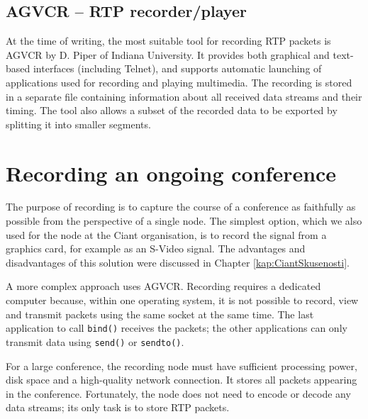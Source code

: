 \subsection{AGVCR -- RTP recorder/player}
At the time of writing, the most suitable tool for recording RTP packets is AGVCR by D. Piper \cite{AGVCR-home} of Indiana University. It provides both graphical and text-based interfaces (including Telnet), and supports automatic launching of applications used for recording and playing multimedia. The recording is stored in a separate file containing information about all received data streams and their timing. The tool also allows a subset of the recorded data to be exported by splitting it into smaller segments.

\section{Recording an ongoing conference}

The purpose of recording is to capture the course of a conference as faithfully as possible from the perspective of a single node. The simplest option, which we also used for the node at the Ciant organisation, is to record the signal from a graphics card, for example as an S-Video signal. The advantages and disadvantages of this solution were discussed in Chapter \ref{kap:CiantSkusenosti}.

A more complex approach uses AGVCR. Recording requires a dedicated computer because, within one operating system, it is not possible to record, view and transmit packets using the same socket at the same time. The last application to call \verb|bind()| receives the packets; the other applications can only transmit data using \verb|send()| or \verb|sendto()|.

For a large conference, the recording node must have sufficient processing power, disk space and a high-quality network connection. It stores all packets appearing in the conference. Fortunately, the node does not need to encode or decode any data streams; its only task is to store RTP packets.

